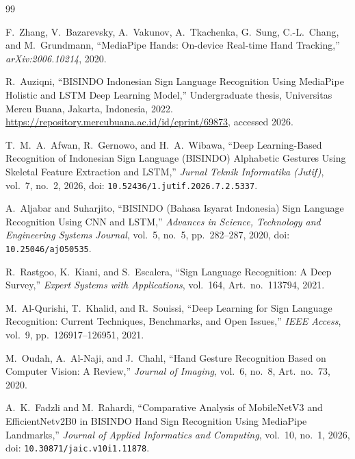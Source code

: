 \documentclass{llncs}
\begin{document}
\begin{thebibliography}{99}

F.~Zhang, V.~Bazarevsky, A.~Vakunov, A.~Tkachenka, G.~Sung,
C.-L.~Chang, and M.~Grundmann, ``MediaPipe Hands: On-device Real-time
Hand Tracking,'' \textit{arXiv:2006.10214}, 2020.

R.~Auziqni, ``BISINDO Indonesian Sign Language Recognition Using MediaPipe
Holistic and LSTM Deep Learning Model,'' Undergraduate thesis, Universitas
Mercu Buana, Jakarta, Indonesia, 2022.
\url{https://repository.mercubuana.ac.id/id/eprint/69873}, accessed 2026.

T.~M.~A.~Afwan, R.~Gernowo, and H.~A.~Wibawa, ``Deep Learning-Based
Recognition of Indonesian Sign Language (BISINDO) Alphabetic Gestures
Using Skeletal Feature Extraction and LSTM,'' \textit{Jurnal Teknik
Informatika (Jutif)}, vol.~7, no.~2, 2026, doi:
\nolinkurl{10.52436/1.jutif.2026.7.2.5337}.

A.~Aljabar and Suharjito, ``BISINDO (Bahasa Isyarat Indonesia) Sign
Language Recognition Using CNN and LSTM,'' \textit{Advances in Science,
Technology and Engineering Systems Journal}, vol.~5, no.~5,
pp.~282--287, 2020, doi: \nolinkurl{10.25046/aj050535}.

R.~Rastgoo, K.~Kiani, and S.~Escalera, ``Sign Language Recognition: A Deep
Survey,'' \textit{Expert Systems with Applications}, vol.~164,
Art.~no.~113794, 2021.

M.~Al-Qurishi, T.~Khalid, and R.~Souissi, ``Deep Learning for Sign Language
Recognition: Current Techniques, Benchmarks, and Open Issues,''
\textit{IEEE Access}, vol.~9, pp.~126917--126951, 2021.

M.~Oudah, A.~Al-Naji, and J.~Chahl, ``Hand Gesture Recognition Based on
Computer Vision: A Review,'' \textit{Journal of Imaging}, vol.~6, no.~8,
Art.~no.~73, 2020.

A.~K.~Fadzli and M.~Rahardi, ``Comparative Analysis of MobileNetV3 and
EfficientNetv2B0 in BISINDO Hand Sign Recognition Using MediaPipe
Landmarks,'' \textit{Journal of Applied Informatics and Computing},
vol.~10, no.~1, 2026, doi: \texttt{10.30871/jaic.v10i1.11878}.


\end{thebibliography}
\end{document}

